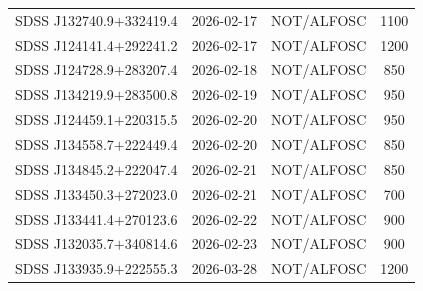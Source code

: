 \begin{longtable}{cccc}
SDSS J132740.9$+$332419.4 & 2026-02-17 & NOT/ALFOSC & 1100 \\
SDSS J124141.4$+$292241.2 & 2026-02-17 & NOT/ALFOSC & 1200 \\
SDSS J124728.9$+$283207.4 & 2026-02-18 & NOT/ALFOSC & 850 \\
SDSS J134219.9$+$283500.8 & 2026-02-19 & NOT/ALFOSC & 950 \\
SDSS J124459.1$+$220315.5 & 2026-02-20 & NOT/ALFOSC & 950 \\
SDSS J134558.7$+$222449.4 & 2026-02-20 & NOT/ALFOSC & 850 \\
SDSS J134845.2$+$222047.4 & 2026-02-21 & NOT/ALFOSC & 850 \\
SDSS J133450.3$+$272023.0 & 2026-02-21 & NOT/ALFOSC & 700 \\
SDSS J133441.4$+$270123.6 & 2026-02-22 & NOT/ALFOSC & 900 \\
SDSS J132035.7$+$340814.6 & 2026-02-23 & NOT/ALFOSC & 900 \\
SDSS J133935.9$+$222555.3 & 2026-03-28 & NOT/ALFOSC & 1200 \\

\end{longtable}